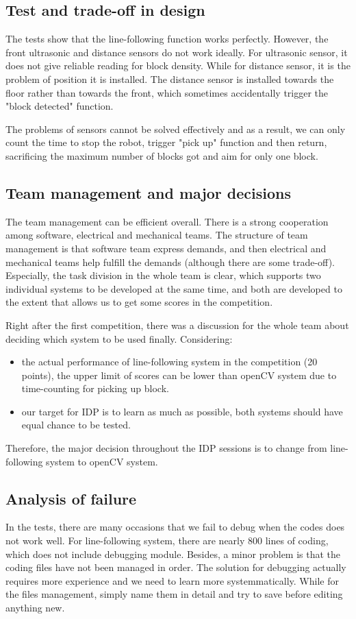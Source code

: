\documentclass{article}
\begin{document}
\subsection{Test and trade-off in design}
The tests show that the line-following function works perfectly. However, the front ultrasonic and distance sensors do not work ideally. For ultrasonic sensor, it does not give reliable reading for block density. While for distance sensor, it is the problem of position it is installed.
The distance sensor is installed towards the floor rather than towards the front, which sometimes accidentally trigger the "block detected" function.

The problems of sensors cannot be solved effectively and as a result, we can only count the time to stop the robot, trigger "pick up" function and then return, sacrificing the maximum number of blocks got and aim for only one block.

\subsection{Team management and major decisions}
The team management can be efficient overall. There is a strong cooperation among software, electrical and mechanical teams. The structure of team management is that software team express demands, and then electrical and mechanical teams help fulfill the demands (although there are some trade-off). Especially, the task division in the whole team is clear, which supports two individual systems to be developed at the same time, and both are developed to the extent that allows us to get some scores in the competition.

Right after the first competition, there was a discussion for the whole team about deciding which system to be used finally.
Considering:

\begin{itemize}
    \item the actual performance of line-following system in the competition (20 points), the upper limit of scores can be lower than openCV system due to time-counting for picking up block.
    \item our target for IDP is to learn as much as possible, both systems should have equal chance to be tested.
\end{itemize}
Therefore, the major decision throughout the IDP sessions is to change from line-following system to openCV system.

\subsection{Analysis of failure}
In the tests, there are many occasions that we fail to debug when the codes does not work well.
For line-following system, there are nearly 800 lines of coding, which does not include debugging module.
Besides, a minor problem is that the coding files have not been managed in order.
The solution for debugging actually requires more experience and we need to learn more systemmatically. While for the files management, simply name them in detail and try to save before editing anything new.
\end{document}
